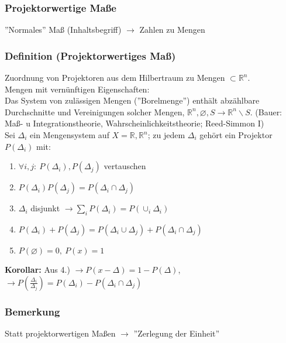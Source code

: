 \documentclass[twoside,a4paper]{scrartcl}
\newcommand{\R}{\mathbb{R}}
\renewcommand{\1}{\mathds{1}}
\newcommand{\ra}{\rightarrow}
\renewcommand{\R}{\mathbb{R}}
\begin{document}
\subsubsection*{Projektorwertige Maße}
''Normales'' Maß (Inhaltsbegriff) $\ra$ Zahlen zu Mengen
\subsubsection*{Definition (Projektorwertiges Maß)}
Zuordnung von Projektoren aus dem Hilbertraum zu Mengen $\subset \R^n$.\\
Mengen mit vernünftigen Eigenschaften:\\
Das System von zulässigen Mengen (''Borelmenge'') enthält abzählbare Durchschnitte und Vereinigungen solcher Mengen, $\R^n, \varnothing, S \ra \R^n \backslash S$.
(Bauer: Maß- u Integrationstheorie, Wahrscheinlichkeitstheorie; Reed-Simmon I)\\
Sei ${\Delta_i}$ ein Mengensystem auf $X=\R,\R^n$; zu jedem $\Delta_i$ gehört ein Projektor $P(\Delta_i)$ mit:
\begin{enumerate}
 \item $\forall i,j: \ P(\Delta_i),P(\Delta_j)$ vertauschen
 \item $P(\Delta_i)P(\Delta_j)=P(\Delta_i \cap \Delta_j)$
 \item ${\Delta_i}$ disjunkt $\ra \sum_iP(\Delta_i)=P(\cup_i\Delta_i)$
 \item $P(\Delta_i)+P(\Delta_j)=P(\Delta_i\cup \Delta_j)+P(\Delta_i\cap \Delta_j)$
 \item $P(\varnothing)=0,\ P(x)=1$
\end{enumerate}
\textbf{Korollar:} Aus 4.) $\ra P(x-\Delta)=1-P(\Delta)$, $\ra P(\frac{\Delta_i}{\Delta_j})=P(\Delta_i)-P(\Delta_i \cap \Delta_j)$
\subsubsection*{Bemerkung}
Statt projektorwertigen Maßen $\ra$ ''Zerlegung der Einheit''
\end{document}
